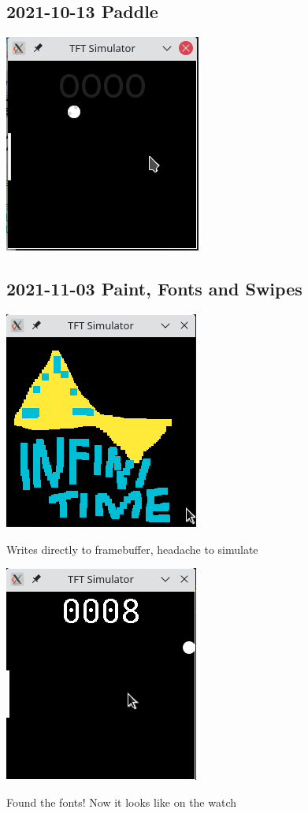 \documentclass{beamer}
\begin{document}
\subsection{2021-10-13 Paddle}
\begin{frame}{}
  \centering\includegraphics[height=0.8\paperheight]{../2021-10-13_Paddle.png}
\end{frame}

\subsection{2021-11-03 Paint, Fonts and Swipes}
\begin{frame}{}
  \centering
  \includegraphics[height=0.8\paperheight]{../2021-11-03_InfiniPaint_logo.png}

  Writes directly to framebuffer, headache to simulate
\end{frame}

\begin{frame}{}
  \centering
  \includegraphics[height=0.8\paperheight]{../2021-11-03_Paddle_with_fonts.png}

  Found the fonts! Now it looks like on the watch
\end{frame}
\end{document}
